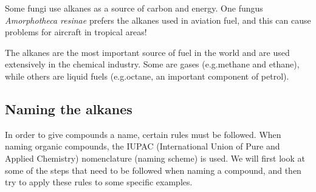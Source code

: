 \begin{IFact}{Some fungi use alkanes as a source of carbon and energy. One fungus \textit{Amorphotheca resinae} prefers the alkanes used in aviation fuel, and this can cause problems for aircraft in tropical areas!}
\end{IFact}

The alkanes are the most important source of fuel in the world and are used extensively in the chemical industry. Some are gases (e.g.\@ methane and ethane), while others are liquid fuels (e.g.\@ octane, an important component of petrol).



\subsection{Naming the alkanes}

In order to give compounds a name, certain rules must be followed. When naming organic compounds, the IUPAC (International Union of Pure and Applied Chemistry) nomenclature (naming scheme) is used. We will first look at some of the steps that need to be followed when naming a compound, and then try to apply these rules to some specific examples.

